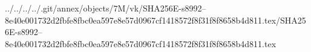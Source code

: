 ../../../../.git/annex/objects/7M/vk/SHA256E-s8992--8e40e001732d2fbfe8fbc0ea597e8e57d0967cf1418572f8f31f8f8658b4d811.tex/SHA256E-s8992--8e40e001732d2fbfe8fbc0ea597e8e57d0967cf1418572f8f31f8f8658b4d811.tex